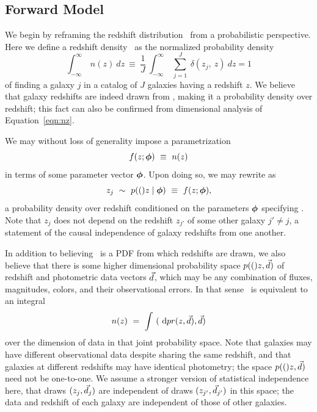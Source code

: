 \subsection{Forward Model}

We begin by reframing the redshift distribution \nz\ from a probabilistic perspective.
Here we define a redshift density \nz\ as the normalized probability density
\begin{equation}
\label{eqn:nz}
\int_{-\infty}^{\infty}\ n(z)\ dz\ \equiv\ \frac{1}{J}\ \int_{-\infty}^{\infty}\ \sum_{j=1}^{J}\ \delta(z_{j},\ z)\ dz = 1
\end{equation}
of finding a galaxy $j$ in a catalog of $J$ galaxies having a redshift $z$.
We believe that galaxy redshifts are indeed drawn from \nz, making it a probability density over redshift; this fact can also be confirmed from dimensional analysis of Equation~\ref{eqn:nz}.

We may without loss of generality impose a parametrization
\begin{equation}
\label{eqn:fz}
f(z; {\boldsymbol{\phi}})\ \equiv\ n(z)
\end{equation}
in terms of some parameter vector ${\boldsymbol{\phi}}$.
Upon doing so, we may rewrite  as 
\begin{equation}
\label{eqn:pz}
z_{j}\ \sim\ p(()z \mid {\ensuremath{\boldsymbol{\phi}}})\ \equiv\ f(z; {\boldsymbol{\phi}}),
\end{equation}
a probability density over redshift conditioned on the parameters ${\boldsymbol{\phi}}$ specifying \nz.
Note that $z_{j}$ does not depend on the redshift $z_{j'}$ of some other galaxy $j' \neq j$, a statement of the causal independence of galaxy redshifts from one another.

In addition to believing \nz\ is a PDF from which redshifts are drawn, we also believe that there is some higher dimensional probability space $p(()z, \vec{d})$ of redshift and photometric data vectors $\vec{d}$, which may be any combination of fluxes, magnitudes, colors, and their observational errors.
In that sense \nz\ is equivalent to an integral
\begin{equation}
\label{eqn:integral}
n(z)\ =\ \int\ (\ \mathrm{d} pr(z, \vec{d}), \vec{d})
\end{equation}
over the dimension of data in that joint probability space.
Note that galaxies may have different observational data despite sharing the same redshift, and that galaxies at different redshifts may have identical photometry; the space $p(()z, \vec{d})$ need not be one-to-one.
We assume a stronger version of statistical independence here, that draws $(z_{j}, \vec{d}_{j})$ are independent of draws $(z_{j'}, \vec{d}_{j'})$ in this space; the data and redshift of each galaxy are independent of those of other galaxies.

